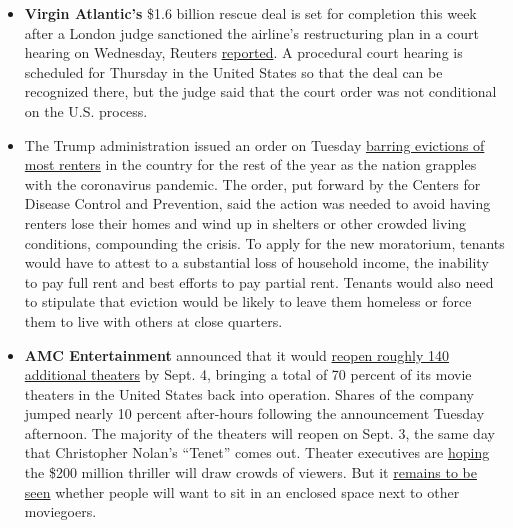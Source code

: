 \begin{itemize}
\item
  \textbf{Virgin Atlantic's} \$1.6 billion rescue deal is set for
  completion this week after a London judge sanctioned the airline's
  restructuring plan in a court hearing on Wednesday, Reuters
  \href{https://www.reuters.com/article/us-health-coronavirus-virgin-atlantic/virgin-atlantic-set-to-seal-rescue-deal-after-london-judge-approves-plan-idUSKBN25T1PH}{reported}.
  A procedural court hearing is scheduled for Thursday in the United
  States so that the deal can be recognized there, but the judge said
  that the court order was not conditional on the U.S. process.
\item
  The Trump administration issued an order on Tuesday
  \href{https://www.nytimes3xbfgragh.onion/2020/09/01/business/eviction-moratorium-order.html?action=click\&module=RelatedLinks\&pgtype=Article}{barring
  evictions of most renters} in the country for the rest of the year as
  the nation grapples with the coronavirus pandemic. The order, put
  forward by the Centers for Disease Control and Prevention, said the
  action was needed to avoid having renters lose their homes and wind up
  in shelters or other crowded living conditions, compounding the
  crisis. To apply for the new moratorium, tenants would have to attest
  to a substantial loss of household income, the inability to pay full
  rent and best efforts to pay partial rent. Tenants would also need to
  stipulate that eviction would be likely to leave them homeless or
  force them to live with others at close quarters.
\item
  \textbf{AMC Entertainment} announced that it would
  \href{https://www.nytimes3xbfgragh.onion/live/2020/09/01/business/stock-market-today-coronavirus/amc-plans-to-reopen-140-additional-theaters-by-friday}{reopen
  roughly 140 additional theaters} by Sept. 4, bringing a total of 70
  percent of its movie theaters in the United States back into
  operation. Shares of the company jumped nearly 10 percent after-hours
  following the announcement Tuesday afternoon. The majority of the
  theaters will reopen on Sept. 3, the same day that Christopher Nolan's
  ``Tenet'' comes out. Theater executives are
  \href{https://www.nytimes3xbfgragh.onion/2020/08/28/business/media/coronavirus-movie-theaters-new-mutants.html}{hoping}
  the \$200 million thriller will draw crowds of viewers. But it
  \href{https://www.nytimes3xbfgragh.onion/2020/08/28/business/media/coronavirus-movie-theaters-new-mutants.html}{remains
  to be seen} whether people will want to sit in an enclosed space next
  to other moviegoers.
\end{itemize}

